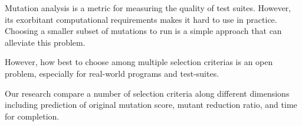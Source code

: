 Mutation analysis is a metric for measuring the quality of test suites. However, its exorbitant computational requirements makes it hard to use in practice. Choosing a smaller subset of mutations to run is a simple approach that can alleviate this problem.

However, how best to choose among multiple selection criterias is an open problem, especially for real-world programs and test-suites.

Our research compare a number of selection criteria along different dimensions including prediction of original mutation score, mutant reduction ratio, and time for completion.



